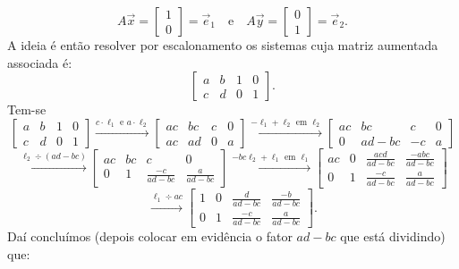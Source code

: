 \begin{equation}
A \vec{x} =
\left[
\begin{array}{c}
1  \\
0 
\end{array}
\right] = \vec{e}_1 \quad \text{e} \quad
A \vec{y} =
\left[
\begin{array}{c}
0  \\
1 
\end{array}
\right] = \vec{e}_2.
\end{equation} A ideia é então resolver por escalonamento os sistemas cuja matriz aumentada associada é:
\begin{equation}
\left[
\begin{array}{cc|cc}
a & b & 1 & 0 \\
c & d & 0 & 1 
\end{array}
\right].
\end{equation} Tem-se
\begin{equation}
\left[
\begin{array}{cc|cc}
a & b & 1 & 0 \\
c & d & 0 & 1 
\end{array}
\right] \xrightarrow{c\cdot \ell_1 \text{ e } a\cdot \ell_2}
\left[
\begin{array}{cc|cc}
ac & bc & c & 0 \\
ac & ad & 0 & a 
\end{array}
\right] \xrightarrow{-\ell_1 + \ell_2 \text{ em } \ell_2}
\left[
\begin{array}{cc|cc}
ac & bc      & c  & 0 \\
0 & ad - bc & -c & a 
\end{array}
\right]
\end{equation}
\begin{equation}
\xrightarrow{\ell_2 \div (ad-bc)}
\left[
\begin{array}{cc|cc}
ac & bc      & c  & 0 \\
0 & 1 & \frac{-c}{ad - bc} & \frac{a}{ad - bc} 
\end{array}
\right]  \xrightarrow{-bc\ell_2 + \ell_1 \text{ em } \ell_1}
\left[
\begin{array}{cc|cc}
ac & 0 & \frac{acd}{ad - bc} & \frac{-abc}{ad - bc} \\
0 & 1 & \frac{-c}{ad - bc}  & \frac{a}{ad - bc} 
\end{array}
\right]
\end{equation}
\begin{equation}
\xrightarrow{\ell_1 \div ac}
\left[
\begin{array}{cc|cc}
1 & 0 & \frac{ d}{ad - bc}  & \frac{-b}{ad - bc} \\
0 & 1 & \frac{-c}{ad - bc}  & \frac{ a}{ad - bc} 
\end{array}
\right].
\end{equation} Daí concluímos (depois colocar em evidência o fator $ad - bc$ que está dividindo) que:

